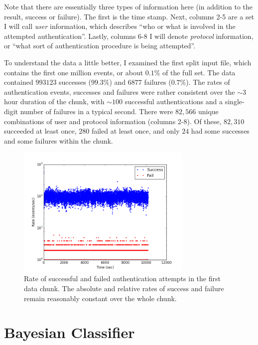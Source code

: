\documentclass[aps, prd, amsmath, floats, floatfix, superscriptaddress,
nofootinbib,eqsecnum]{revtex4}
\begin{document}
Note that there are essentially three types of information here (in addition to the result, success or failure).
The first is the time stamp.
Next, columns 2-5 are a set I will call \emph{user} information, which describes
``who or what is involved in the attempted authentication''.
Lastly, columns 6-8 I will denote \emph{protocol} information, or ``what sort of authentication procedure is being attempted''.

To understand the data a little better, I examined the first split input file, which contains the first one million events,
or about $0.1\%$ of the full set. The data contained $993123$ successes ($99.3\%$) and $6877$ failures ($0.7\%$).
The rates of authentication events, successes and failures were rather consistent over the $\sim 3$ hour duration
of the chunk, with $\sim 100$ successful authentications and a single-digit number of failures in a typical second.
There were $82,566$ unique combinations of user and protocol information (columns 2-8). Of these, $82,310$ succeeded at least once,
$280$ failed at least once, and only $24$ had some successes and some failures within the chunk.

\begin{figure}
\label{Figure1}
\includegraphics[width=0.75\textwidth]{rate_x00000.png}
\caption{Rate of successful and failed authentication attempts in the first data chunk.
The absolute and relative rates of success and failure remain reasonably constant over the whole chunk.}
\end{figure}

\section{Bayesian Classifier}
\label{sec:Bayes}
\end{document}
